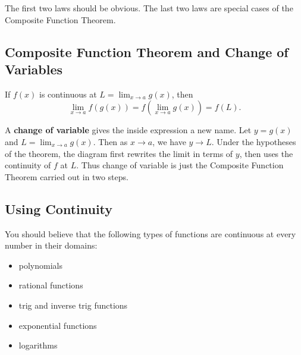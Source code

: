 The first two laws should be obvious. 
The last two laws are special cases of the Composite Function Theorem.

\subsection{Composite Function Theorem and Change of Variables}


\begin{thm}
If $f(x)$ is continuous at $L=\displaystyle\lim _{x \to a} g(x)$, then
$$\lim _{x \to a} f(g(x))=f\left(\lim _{x \to a} g(x)\right)=f(L).$$
\end{thm}

A \textbf{change of variable} gives the inside expression a new name. Let
$y=g(x)$ and $L=\displaystyle\lim_{x\to a}g(x)$. Then as $x\to a$, we have
$y\to L$. Under the hypotheses of the theorem, the diagram first rewrites the
limit in terms of $y$, then uses the continuity of $f$ at $L$. Thus change of
variable is just the Composite Function Theorem carried out in two steps.

\begin{center}
\end{center}



\subsection{Using Continuity}

You should believe that the following types of functions are continuous at every number in their domains:
\begin{itemize}
\item polynomials
\item rational functions
\item trig and inverse trig functions
\item exponential functions
\item logarithms
\end{itemize}

